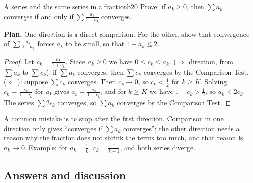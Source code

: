 \documentclass[11pt]{article}
\begin{document}
\begin{exmp}{A series and the same series in a fraction}{b20}
Prove: if $a_k\ge0$, then $\sum a_k$ converges if and only if $\sum\frac{a_k}{1+a_k}$ converges.

\textbf{Plan.} One direction is a direct comparison. For the other, show that convergence of $\sum\frac{a_k}{1+a_k}$ forces $a_k$ to be small, so that $1+a_k\le2$.

\begin{proof}
Let $c_k=\frac{a_k}{1+a_k}$. Since $a_k\ge0$ we have $0\le c_k\le a_k$. ($\Rightarrow$ direction, from $\sum a_k$ to $\sum c_k$): if $\sum a_k$ converges, then $\sum c_k$ converges by the Comparison Test. ($\Leftarrow$): suppose $\sum c_k$ converges. Then $c_k\to0$, so $c_k<\frac12$ for $k\ge K$. Solving $c_k=\frac{a_k}{1+a_k}$ for $a_k$ gives $a_k=\frac{c_k}{1-c_k}$, and for $k\ge K$ we have $1-c_k>\frac12$, so $a_k<2c_k$. The series $\sum2c_k$ converges, so $\sum a_k$ converges by the Comparison Test.
\end{proof}
A common mistake is to stop after the first direction. Comparison in one direction only gives ``converges if $\sum a_k$ converges''; the other direction needs a reason why the fraction does not shrink the terms too much, and that reason is $a_k\to0$. Example: for $a_k=\frac1k$, $c_k=\frac1{k+1}$, and both series diverge.
\end{exmp}

\subsection*{Answers and discussion}
\end{document}
